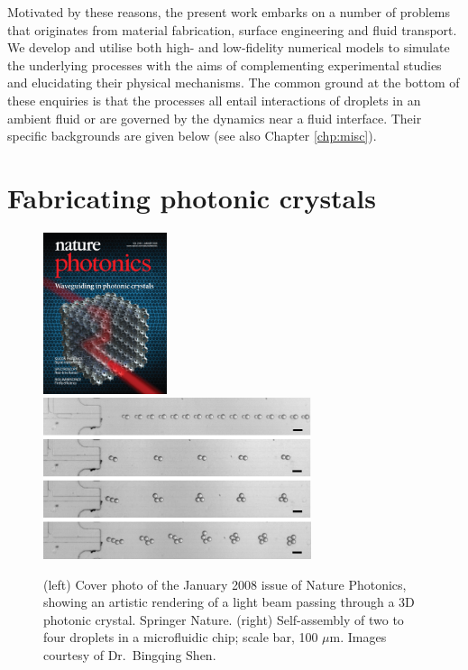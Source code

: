 Motivated by these reasons, the present work embarks on a number of problems that originates from material fabrication, surface engineering and fluid transport.
We develop and utilise both high- and low-fidelity numerical models to simulate the underlying processes with the aims of
complementing experimental studies and elucidating their physical mechanisms.
The common ground at the bottom of these enquiries is that the processes all entail interactions of droplets in an ambient fluid or
are governed by the dynamics near a fluid interface.
Their specific backgrounds are given below (see also Chapter \ref{chp:misc}).



\section{Fabricating photonic crystals}

\begin{figure}%
  \centering
  \includegraphics[height=4.73cm]{photonics_cover.jpg}
  \includegraphics[height=4.73cm]{flow-assist1.png}
  \caption{(left) Cover photo of the January 2008 issue of Nature Photonics, showing an artistic rendering of a light beam passing through a 3D photonic crystal. \textcopyright \enspace Springer Nature. (right) Self-assembly of two to four droplets in a microfluidic chip; scale bar, 100 $\mu$m. Images courtesy of Dr.\ Bingqing Shen.}
  \label{fig:photonic-flow}
\end{figure}

